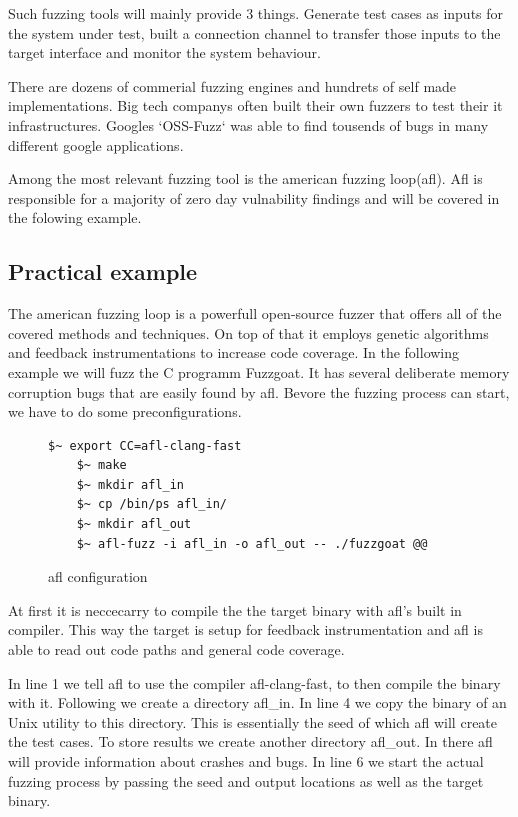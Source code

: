 \documentclass[journal=tosc,final]{iacrtrans}
\begin{document}
Such fuzzing tools will mainly provide 3 things. Generate test cases as inputs for the system under test, built a connection channel to transfer those inputs to the target interface and monitor the system behaviour.

There are dozens of commerial fuzzing engines and hundrets of self made implementations. Big tech companys often built their own fuzzers to test their it infrastructures. Googles `OSS-Fuzz` was able to find tousends of bugs in many different google applications. 

Among the most relevant fuzzing tool is the american fuzzing loop(afl).
Afl is responsible for a majority of zero day vulnability findings and will be covered in the folowing example.
\subsection{Practical example}
The american fuzzing loop is a powerfull open-source fuzzer that offers all of the covered methods and techniques. On top of that it employs genetic algorithms and feedback instrumentations to increase code coverage. In the following example we will fuzz the C programm Fuzzgoat. It has several deliberate memory corruption bugs that are easily found by afl. Bevore the  fuzzing process can start, we have to do some preconfigurations. 
\begin{figure}[h]
 \caption{afl configuration}
 \begin{lstlisting}[style=code]
    $~ export CC=afl-clang-fast
    $~ make
    $~ mkdir afl_in
    $~ cp /bin/ps afl_in/   
    $~ mkdir afl_out
    $~ afl-fuzz -i afl_in -o afl_out -- ./fuzzgoat @@
\end{lstlisting}
\end{figure}

At first it is neccecarry to compile the the target binary with afl's built in compiler. This way the target is setup for feedback instrumentation and afl is able to read out code paths and general code coverage.

In line 1 we tell afl to use the compiler afl-clang-fast, to then compile the binary with it.
Following we create a directory afl\_in. In line 4 we copy the binary of an Unix utility to this directory. This is essentially the seed of which afl will create the test cases. To store results we create another directory afl\_out. In there afl will provide information about crashes and bugs. 
In line 6 we start the actual fuzzing process by passing the seed and output locations as well as the target binary. 
\end{document}
